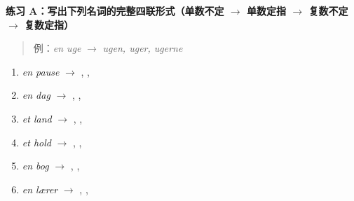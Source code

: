 
\textbf{练习 A：写出下列名词的完整四联形式（单数不定 $\rightarrow$ 单数定指 $\rightarrow$ 复数不定 $\rightarrow$ 复数定指）}
\begin{quote}
\small 例：\textit{en uge} $\rightarrow$ \textit{ugen, uger, ugerne}
\end{quote}
\begin{enumerate}
  \item \textit{en pause} $\rightarrow$ \underline{\hspace{2.4cm}}, \underline{\hspace{2.4cm}}, \underline{\hspace{2.6cm}}
  \item \textit{en dag} $\rightarrow$ \underline{\hspace{2.4cm}}, \underline{\hspace{2.4cm}}, \underline{\hspace{2.6cm}}
  \item \textit{et land} $\rightarrow$ \underline{\hspace{2.4cm}}, \underline{\hspace{2.4cm}}, \underline{\hspace{2.6cm}}
  \item \textit{et hold} $\rightarrow$ \underline{\hspace{2.4cm}}, \underline{\hspace{2.4cm}}, \underline{\hspace{2.6cm}}
  \item \textit{en bog} $\rightarrow$ \underline{\hspace{2.4cm}}, \underline{\hspace{2.4cm}}, \underline{\hspace{2.6cm}}
  \item \textit{en lærer} $\rightarrow$ \underline{\hspace{2.4cm}}, \underline{\hspace{2.4cm}}, \underline{\hspace{2.6cm}}
\end{enumerate}


